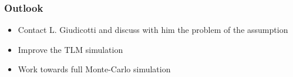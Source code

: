 \documentclass{beamer}
\begin{document}
    \begin{frame}
        \frametitle{Outlook}

        \begin{itemize}
            \item Contact L. Giudicotti and discuss with him the problem of the assumption
            \item Improve the TLM simulation
            \item Work towards full Monte-Carlo simulation
        \end{itemize}

    \end{frame}
\end{document}
